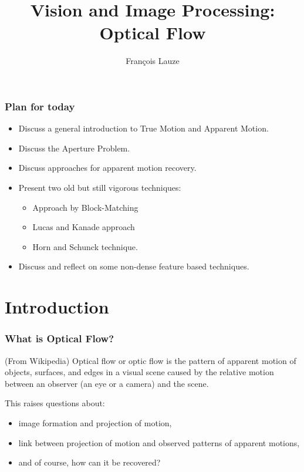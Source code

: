 \documentclass[10pt]{beamer}
\title{Vision and Image Processing: Optical Flow}
\author[F.~Lauze] %
{Fran{\c c}ois Lauze}
\institute[DIKU] %
{
  Department of Computer Science\\
  University of Copenhagen
}
\date[2015-2016 B2] %
\begin{document}
\maketitle










\begin{frame}
  \frametitle{Plan for today}
  \begin{itemize}
  \item Discuss a general introduction to True Motion and Apparent Motion.
  \item Discuss the Aperture Problem.
  \item Discuss approaches for apparent motion recovery.
  \item Present two old but still vigorous techniques: 
    \begin{itemize}
    \item Approach by Block-Matching
    \item Lucas and Kanade approach
    \item Horn and Schunck technique.
    \end{itemize}
  \item Discuss and reflect on some non-dense feature based techniques.
  \end{itemize}

\end{frame}




\section{Introduction}

\begin{frame}
  \frametitle{What is Optical Flow?}
  \begin{definition}{(From Wikipedia)}
    Optical flow or optic flow is the pattern of apparent motion of objects, surfaces, and
    edges in a visual scene caused by the relative motion between an observer (an eye or a
    camera) and the scene.
  \end{definition}
  \vfill\pause
  
  This raises questions about:
  \begin{itemize}
    \item image formation and projection of motion,
    \item link between projection of motion and observed patterns of apparent motions,
    \item and of course, how can it be recovered?
  \end{itemize}
\end{frame}
\end{document}
